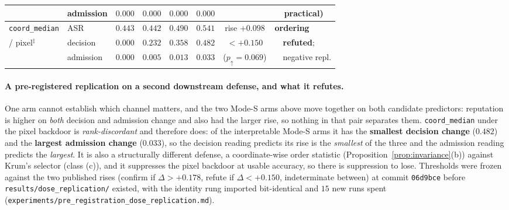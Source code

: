 \documentclass{article}
\begin{document}
\begin{table}[h]
\begin{tabular}{llcccccl}
 & admission & $0.000$ & $0.000$ & $0.000$ & $0.000$ & & \ \ practical) \\
\midrule
\texttt{coord\_median} & ASR & $0.443$ & $0.442$ & $0.490$ & $0.541$ & rise $+0.098$ & \textbf{ordering} \\
/ pixel$^{\ddagger}$ & decision & $0.000$ & $0.232$ & $0.358$ & $0.482$ & $<{+}0.150$ & \ \ \textbf{refuted}; \\
 & admission & $0.000$ & $0.005$ & $0.013$ & $0.033$ & ($p_{\uparrow}{=}0.069$) & \ \ negative repl. \\
\bottomrule
\end{tabular}
\end{table}

\paragraph{A pre-registered replication on a second downstream defense, and what it refutes.} One arm cannot establish which channel matters, and the two Mode-S arms above move together on both candidate predictors: reputation is higher on \emph{both} decision and admission change and also had the larger rise, so nothing in that pair separates them. \texttt{coord\_median} under the pixel backdoor is \emph{rank-discordant} and therefore does: of the interpretable Mode-S arms it has the \textbf{smallest decision change} ($0.482$) and the \textbf{largest admission change} ($0.033$), so the decision reading predicts its rise is the \emph{smallest} of the three and the admission reading predicts the \emph{largest}. It is also a structurally different defense, a coordinate-wise order statistic (Proposition~\ref{prop:invariance}(b)) against Krum's selector (class (c)), and it suppresses the pixel backdoor at usable accuracy, so there is suppression to lose. Thresholds were frozen against the two published rises (confirm if $\Delta > +0.178$, refute if $\Delta < +0.150$, indeterminate between) at commit \texttt{06d9bce} before \texttt{results/dose\_replication/} existed, with the identity rung imported bit-identical and $15$ new runs spent (\texttt{experiments/pre\_registration\_dose\_replication.md}).
\end{document}
